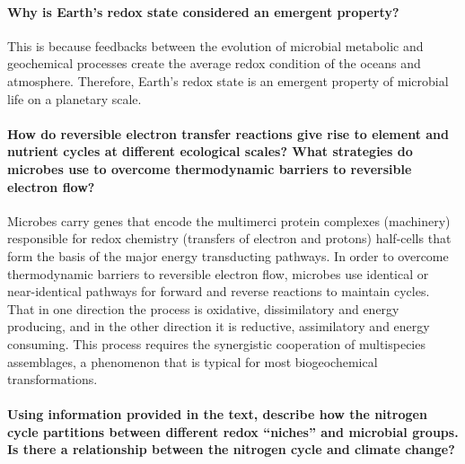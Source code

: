 \documentclass[]{article}
\let\oldparagraph\paragraph
\renewcommand{\paragraph}[1]{\oldparagraph{#1}\mbox{}}
\begin{document}
\paragraph{Why is Earth's redox state considered an emergent
property?}\label{why-is-earths-redox-state-considered-an-emergent-property}

This is because feedbacks between the evolution of microbial metabolic
and geochemical processes create the average redox condition of the
oceans and atmosphere. Therefore, Earth's redox state is an emergent
property of microbial life on a planetary scale.

\paragraph{How do reversible electron transfer reactions give rise to
element and nutrient cycles at different ecological scales? What
strategies do microbes use to overcome thermodynamic barriers to
reversible electron
flow?}\label{how-do-reversible-electron-transfer-reactions-give-rise-to-element-and-nutrient-cycles-at-different-ecological-scales-what-strategies-do-microbes-use-to-overcome-thermodynamic-barriers-to-reversible-electron-flow}

Microbes carry genes that encode the multimerci protein complexes
(machinery) responsible for redox chemistry (transfers of electron and
protons) half-cells that form the basis of the major energy transducting
pathways. In order to overcome thermodynamic barriers to reversible
electron flow, microbes use identical or near-identical pathways for
forward and reverse reactions to maintain cycles. That in one direction
the process is oxidative, dissimilatory and energy producing, and in the
other direction it is reductive, assimilatory and energy consuming. This
process requires the synergistic cooperation of multispecies
assemblages, a phenomenon that is typical for most biogeochemical
transformations.

\paragraph{\texorpdfstring{Using information provided in the text,
describe how the nitrogen cycle partitions between different redox
``niches'' and microbial groups. Is there a relationship between the
nitrogen cycle and climate
change?}{Using information provided in the text, describe how the nitrogen cycle partitions between different redox niches and microbial groups. Is there a relationship between the nitrogen cycle and climate change?}}\label{using-information-provided-in-the-text-describe-how-the-nitrogen-cycle-partitions-between-different-redox-niches-and-microbial-groups.-is-there-a-relationship-between-the-nitrogen-cycle-and-climate-change}
\end{document}
